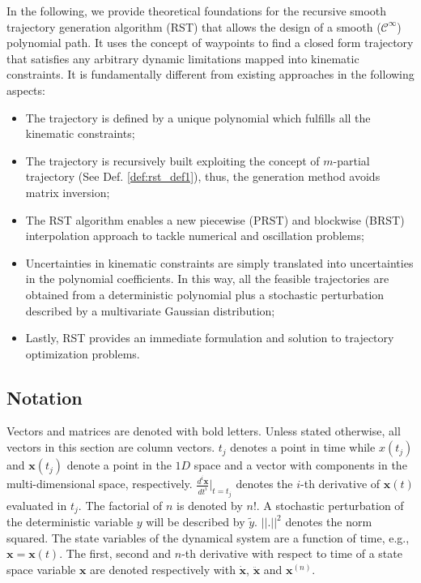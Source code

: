 In the following, we provide theoretical foundations for the recursive smooth trajectory generation algorithm (RST) that allows the design of a smooth ($\mathcal{C}^{\infty}$) polynomial path. It uses the concept of waypoints to find a closed form trajectory that satisfies any arbitrary dynamic limitations mapped into kinematic constraints. It is fundamentally different from existing approaches \cite{6376099} in the following aspects:
\begin{itemize}
\item The trajectory is defined by a unique polynomial which fulfills all the kinematic constraints;
\item The trajectory is recursively built exploiting the concept of $m$-partial trajectory (See Def. \ref{def:rst_def1}), thus, the generation method avoids matrix inversion;
\item The RST algorithm enables a new piecewise (PRST) and blockwise (BRST) interpolation approach to tackle numerical and oscillation problems;
\item Uncertainties in kinematic constraints are simply translated into uncertainties in the polynomial coefficients. In this way, all the feasible trajectories are obtained from a deterministic polynomial plus a stochastic perturbation described by a multivariate Gaussian distribution;
\item Lastly, RST provides an immediate formulation and solution to trajectory optimization problems.
\end{itemize}


\subsection*{Notation}
\label{subsec:rst_notation}
Vectors and matrices are denoted with bold letters. Unless stated otherwise, all vectors in this section are column vectors.
$t_j$ denotes a point in time while $x(t_j)$ and $\mathbf{x}(t_j)$ denote a point in the $1D$ space and a vector with components in the multi-dimensional space, respectively. $\frac{d^i\mathbf{x}}{dt^i}\bigr|_{t=t_j}$ denotes the $i$-th derivative of $\mathbf{x}(t)$ evaluated in $t_j$. The factorial of $n$ is denoted by $n!$. A stochastic perturbation of the deterministic variable $y$ will be described by $\tilde{y}$. $||.||^2$ denotes the norm squared.
The state variables of the dynamical system are a function of time, e.g., $\bm{x} = \bm{x}(t)$. The first, second and $n$-th derivative with respect to time of a state space variable $\bm{x}$ are denoted respectively with $\bm{\dot{x}}$, $\bm{\ddot{x}}$ and $\bm{x}^{(n)}$. 